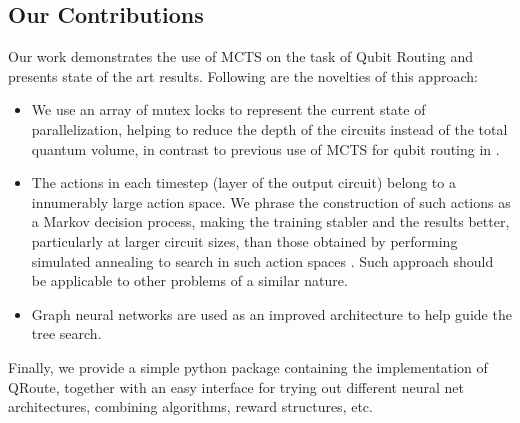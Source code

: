 \subsection{\label{sec:intro-contribution}Our Contributions}

Our work demonstrates the use of MCTS on the task of Qubit Routing and presents state of the art results. Following are the novelties of this approach:

\begin{itemize}
    \item We use an array of mutex locks to represent the current state of parallelization, helping to reduce the depth of the circuits instead of the total quantum volume, in contrast to previous use of MCTS for qubit routing in \cite{qroute_mcts}.
    \item The actions in each timestep (layer of the output circuit) belong to a innumerably large action space. We phrase the construction of such actions as a Markov decision process, making the training stabler and the results better, particularly at larger circuit sizes, than those obtained by performing simulated annealing to search in such action spaces \cite{qroute_dqn1, qroute_dqn2}. Such approach should be applicable to other problems of a similar nature.
    \item Graph neural networks are used as an improved architecture to help guide the tree search.
\end{itemize}

Finally, we provide a simple python package containing the implementation of QRoute, together with  an easy interface for trying out different neural net architectures, combining algorithms, reward structures, etc.

